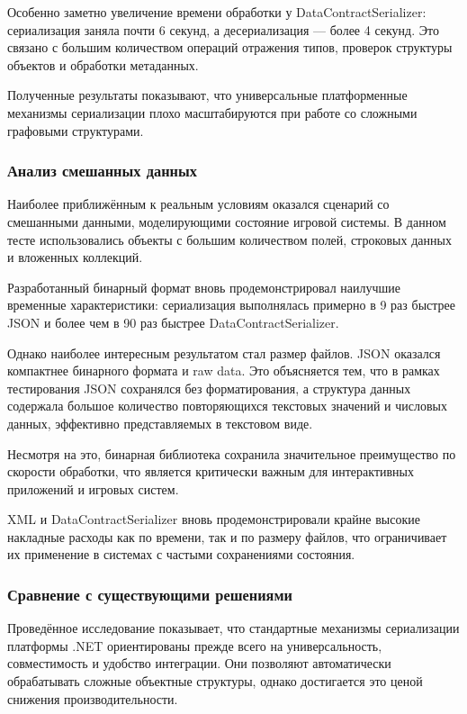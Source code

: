 \documentclass[coursework]{SCWorks}
\begin{document}
Особенно заметно увеличение времени обработки у DataContractSerializer: сериализация заняла почти 6 секунд, а десериализация — более 4 секунд. Это связано с большим количеством операций отражения типов, проверок структуры объектов и обработки метаданных.

Полученные результаты показывают, что универсальные платформенные механизмы сериализации плохо масштабируются при работе со сложными графовыми структурами.

\subsubsection{Анализ смешанных данных}

Наиболее приближённым к реальным условиям оказался сценарий со смешанными данными, моделирующими состояние игровой системы. В данном тесте использовались объекты с большим количеством полей, строковых данных и вложенных коллекций.

Разработанный бинарный формат вновь продемонстрировал наилучшие временные характеристики: сериализация выполнялась примерно в 9 раз быстрее JSON и более чем в 90 раз быстрее DataContractSerializer.

Однако наиболее интересным результатом стал размер файлов. JSON оказался компактнее бинарного формата и raw data. Это объясняется тем, что в рамках тестирования JSON сохранялся без форматирования, а структура данных содержала большое количество повторяющихся текстовых значений и числовых данных, эффективно представляемых в текстовом виде.

Несмотря на это, бинарная библиотека сохранила значительное преимущество по скорости обработки, что является критически важным для интерактивных приложений и игровых систем.

XML и DataContractSerializer вновь продемонстрировали крайне высокие накладные расходы как по времени, так и по размеру файлов, что ограничивает их применение в системах с частыми сохранениями состояния.

\subsubsection{Сравнение с существующими решениями}

Проведённое исследование показывает, что стандартные механизмы сериализации платформы .NET ориентированы прежде всего на универсальность, совместимость и удобство интеграции. Они позволяют автоматически обрабатывать сложные объектные структуры, однако достигается это ценой снижения производительности.
\end{document}
